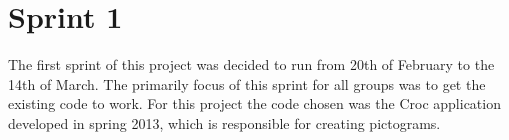 \chapter{Sprint 1}
The first sprint of this project was decided to run from 20th of February to the 14th of March.
The primarily focus of this sprint for all groups was to get the existing code to work.
For this project the code chosen was the Croc application developed in spring 2013, which is responsible for creating pictograms.


